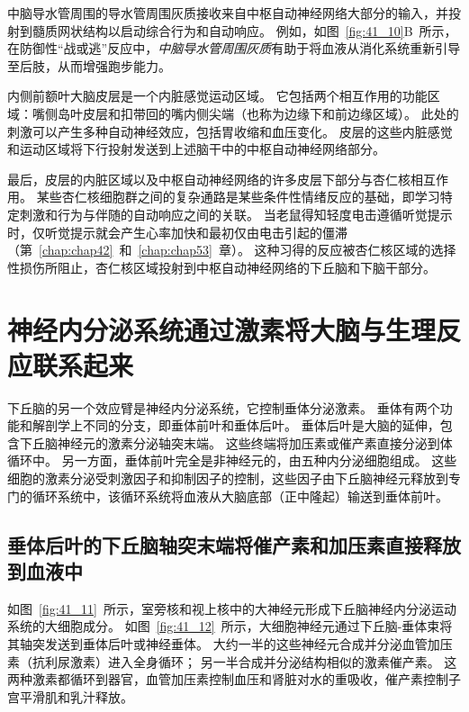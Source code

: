 中脑导水管周围的导水管周围灰质接收来自中枢自动神经网络大部分的输入，并投射到髓质网状结构以启动综合行为和自动响应。
例如，如图~\ref{fig:41_10}B~所示，在防御性“战或逃”反应中，\textit{中脑导水管周围灰质}有助于将血液从消化系统重新引导至后肢，从而增强跑步能力。


内侧前额叶大脑皮层是一个内脏感觉运动区域。
它包括两个相互作用的功能区域：嘴侧岛叶皮层和扣带回的嘴内侧尖端（也称为边缘下和前边缘区域）。
此处的刺激可以产生多种自动神经效应，包括胃收缩和血压变化。
皮层的这些内脏感觉和运动区域将下行投射发送到上述脑干中的中枢自动神经网络部分。


最后，皮层的内脏区域以及中枢自动神经网络的许多皮层下部分与杏仁核相互作用。
某些杏仁核细胞群之间的复杂通路是某些条件性情绪反应的基础，即学习特定刺激和行为与伴随的自动响应之间的关联。
当老鼠得知轻度电击遵循听觉提示时，仅听觉提示就会产生心率加快和最初仅由电击引起的僵滞（第~\ref{chap:chap42}~和~\ref{chap:chap53}~章）。
这种习得的反应被杏仁核区域的选择性损伤所阻止，杏仁核区域投射到中枢自动神经网络的下丘脑和下脑干部分。



\section{神经内分泌系统通过激素将大脑与生理反应联系起来}

下丘脑的另一个效应臂是神经内分泌系统，它控制垂体分泌激素。
垂体有两个功能和解剖学上不同的分支，即垂体前叶和垂体后叶。
垂体后叶是大脑的延伸，包含下丘脑神经元的激素分泌轴突末端。
这些终端将加压素或催产素直接分泌到体循环中。
另一方面，垂体前叶完全是非神经元的，由五种内分泌细胞组成。
这些细胞的激素分泌受刺激因子和抑制因子的控制，这些因子由下丘脑神经元释放到专门的循环系统中，该循环系统将血液从大脑底部（正中隆起）输送到垂体前叶。



\subsection{垂体后叶的下丘脑轴突末端将催产素和加压素直接释放到血液中}

如图~\ref{fig:41_11}~所示，室旁核和视上核中的大神经元形成下丘脑神经内分泌运动系统的大细胞成分。
如图~\ref{fig:41_12}~所示，大细胞神经元通过下丘脑-垂体束将其轴突发送到垂体后叶或神经垂体。
大约一半的这些神经元合成并分泌血管加压素（抗利尿激素）进入全身循环；
另一半合成并分泌结构相似的激素催产素。
这两种激素都循环到器官，血管加压素控制血压和肾脏对水的重吸收，催产素控制子宫平滑肌和乳汁释放。


